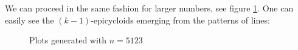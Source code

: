 \documentclass{article}
\begin{document}
We can proceed in the same fashion for larger numbers, see figure \ref{fig:thrm}. One can easily see the $(k-1)$-epicycloids emerging from the patterns of lines:
\begin{figure}[h]
    \centering
    \caption{Plots generated with $n=5123$}
    \label{fig:thrm}
\end{figure}
\newpage
\end{document}
